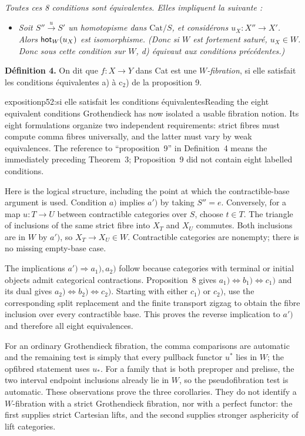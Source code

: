 \textit{Toutes ces 8 conditions sont équivalentes. Elles impliquent la suivante :}

\begin{itemize}[leftmargin=4em]
\item[\textit{d)}] \textit{Soit $S'' \xrightarrow{u} S'$ un homotopisme dans $\mathrm{Cat}/S$, et considérons $u_X : X'' \longrightarrow X'$. Alors $\mathsf{hot}_W(u_X)$ est isomorphisme. (Donc si $W$ est fortement saturé, $u_X \in W$. Donc sous cette condition sur $W$, d) équivaut aux conditions précédentes.)}
\end{itemize}

\textbf{Définition 4.} On dit que $f : X \longrightarrow Y$ dans Cat est une \textit{$W$-fibration}, si elle satisfait les conditions équivalentes a) à c$_2$) de la proposition 9.

\begin{dcomment}{exposition}{p52:si elle satisfait les conditions équivalentes}{Reading the eight equivalent conditions}
Grothendieck has now isolated a usable fibration notion. Its eight formulations organize two independent requirements: strict fibres must compute comma fibres universally, and the latter must vary by weak equivalences. The reference to ``proposition~9'' in Definition~4 means the immediately preceding Theorem~3; Proposition~9 did not contain eight labelled conditions.

Here is the logical structure, including the point at which the contractible-base argument is used. Condition $a)$ implies $a')$ by taking $S''=e$. Conversely, for a map $u:T\to U$ between contractible categories over $S$, choose $t\in T$. The triangle of inclusions of the same strict fibre into $X_T$ and $X_U$ commutes. Both inclusions are in $W$ by $a')$, so $X_T\to X_U\in W$. Contractible categories are nonempty; there is no missing empty-base case.

The implications $a')\Rightarrow a_1),a_2)$ follow because categories with terminal or initial objects admit categorical contractions. Proposition~8 gives $a_1)\Longleftrightarrow b_1)\Longleftrightarrow c_1)$ and its dual gives $a_2)\Longleftrightarrow b_2)\Longleftrightarrow c_2)$. Starting with either $c_1)$ or $c_2)$, use the corresponding split replacement and the finite transport zigzag to obtain the fibre inclusion over every contractible base. This proves the reverse implication to $a')$ and therefore all eight equivalences.

For an ordinary Grothendieck fibration, the comma comparisons are automatic and the remaining test is simply that every pullback functor $u^*$ lies in $W$; the opfibred statement uses $u_*$. For a family that is both preproper and prelisse, the two interval endpoint inclusions already lie in $W$, so the pseudofibration test is automatic. These observations prove the three corollaries. They do not identify a $W$-fibration with a strict Grothendieck fibration, nor with a perfect functor: the first supplies strict Cartesian lifts, and the second supplies stronger asphericity of lift categories.
\end{dcomment}


